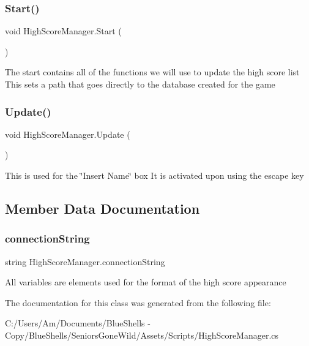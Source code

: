 \subsubsection{\texorpdfstring{Start()}{Start()}}
{\footnotesize\ttfamily void High\+Score\+Manager.\+Start (\begin{DoxyParamCaption}{ }\end{DoxyParamCaption})\hspace{0.3cm}{\ttfamily [private]}}



The start contains all of the functions we will use to update the high score list This sets a path that goes directly to the database created for the game 

\mbox{\label{class_high_score_manager_ad75f6456ad76309b4744a3c592da7443}} 
\subsubsection{\texorpdfstring{Update()}{Update()}}
{\footnotesize\ttfamily void High\+Score\+Manager.\+Update (\begin{DoxyParamCaption}{ }\end{DoxyParamCaption})\hspace{0.3cm}{\ttfamily [private]}}



This is used for the \char`\"{}\+Insert Name\char`\"{} box It is activated upon using the escape key 



\subsection{Member Data Documentation}
\mbox{\label{class_high_score_manager_a9d8d74d89d2986ad69f282c1129d04a9}} 
\subsubsection{\texorpdfstring{connection\+String}{connectionString}}
{\footnotesize\ttfamily string High\+Score\+Manager.\+connection\+String\hspace{0.3cm}{\ttfamily [private]}}



All variables are elements used for the format of the high score appearance 



The documentation for this class was generated from the following file\+:\begin{DoxyCompactItemize}
\item 
C\+:/\+Users/\+Am/\+Documents/\+Blue\+Shells -\/ Copy/\+Blue\+Shells/\+Seniors\+Gone\+Wild/\+Assets/\+Scripts/High\+Score\+Manager.\+cs\end{DoxyCompactItemize}
